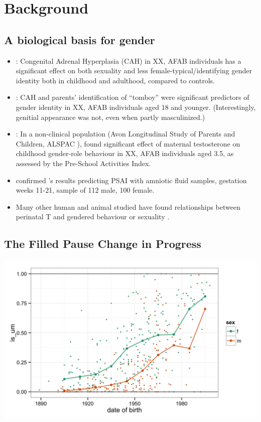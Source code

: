 \documentclass[a0,portrait]{a0poster}
\begin{document}
\begin{multicols}{2}
\begin{enumerate}
\end{enumerate}

\section*{Background}
\subsection*{A biological basis for gender}



\begin{itemize}
	\item \citet{hinesetal2004}: Congenital Adrenal Hyperplasia (CAH) in XX, AFAB individuals has a significant effect on both sexuality and less female-typical/identifying gender identity both in childhood and adulthood, compared to controls.
	\item \citet{berenbaumbailey2003}: CAH and parents' identification of ``tomboy'' were significant predictors of gender identity in XX, AFAB individuals aged 18 and younger. (Interestingly, genitial appearance was not, even when partly masculinized.)
	\item \citet{hinesetal2002}: In a non-clinical population (Avon Longitudinal Study of Parents and Children, ALSPAC \citealt{alspac2001}), found significant effect of maternal testosterone on childhood gender-role behaviour in XX, AFAB individuals aged 3.5, as assessed by the Pre-School Activities Index.
	\item \citet{auyeungetal2009} confirmed \citet{hinesetal2002}'s results predicting PSAI with amniotic fluid samples, gestation weeks 11-21, sample of 112 male, 100 female.
	\item Many other human and animal studied have found relationships between perinatal T and gendered behaviour or sexuality \citep[see][for reviews]{hines2006, balthazart2011}.
\end{itemize}

\subsection*{The Filled Pause Change in Progress}

\begin{center}\vspace{1cm}
\includegraphics[width=0.6\linewidth]{um.png}
\end{center}\vspace{1cm}


\end{multicols}
\end{document}
